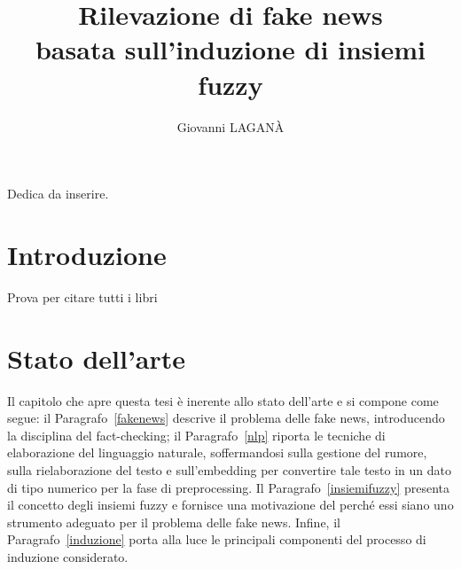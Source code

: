 \documentclass[12pt]{report}
\theoremstyle{definition}
\begin{document}
\title{Rilevazione di fake news \\
basata sull'induzione di insiemi fuzzy}
\author{Giovanni LAGANÀ}
%
%
%
\beforepreface
        {\hfill \Large {\sl \begin{flushright} Dedica da inserire.         
\end{flushright}         }}
%
%
%
%
\afterpreface

%
%

\chapter*{Introduzione}
  
\onehalfspacing

Prova per citare tutti i libri
\cite{1,2,3,4,5,6,7,8,9,10,11,12,13,14,15,16,17,18,19,20,21,22}


\chapter{Stato dell'arte}
\label{Capitolo 1}
\onehalfspacing

Il capitolo che apre questa tesi è inerente allo stato dell'arte e si compone come segue: il Paragrafo~\ref{fakenews} descrive il problema delle fake news, introducendo la disciplina del fact-checking; il Paragrafo~\ref{nlp} riporta le tecniche di elaborazione del linguaggio naturale, soffermandosi sulla gestione del rumore, sulla rielaborazione del testo e sull'embedding per convertire tale testo in un dato di tipo numerico per la fase di preprocessing. 
Il Paragrafo~\ref{insiemifuzzy} presenta il concetto degli insiemi fuzzy e fornisce una motivazione del perché essi siano uno strumento adeguato per il problema delle fake news.
Infine, il Paragrafo~\ref{induzione} porta alla luce le principali componenti del processo di induzione considerato.
\end{document}
